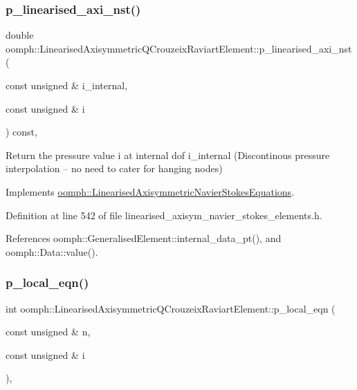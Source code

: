 \subsubsection{\texorpdfstring{p\+\_\+linearised\+\_\+axi\+\_\+nst()}{p\_linearised\_axi\_nst()}}
{\footnotesize\ttfamily double oomph\+::\+Linearised\+Axisymmetric\+Q\+Crouzeix\+Raviart\+Element\+::p\+\_\+linearised\+\_\+axi\+\_\+nst (\begin{DoxyParamCaption}\item[{const unsigned \&}]{i\+\_\+internal,  }\item[{const unsigned \&}]{i }\end{DoxyParamCaption}) const\hspace{0.3cm}{\ttfamily [inline]}, {\ttfamily [virtual]}}



Return the pressure value i at internal dof i\+\_\+internal (Discontinous pressure interpolation -- no need to cater for hanging nodes) 



Implements \hyperlink{classoomph_1_1LinearisedAxisymmetricNavierStokesEquations_aed0485a01052ffe2a5c9f36d6dd07da4}{oomph\+::\+Linearised\+Axisymmetric\+Navier\+Stokes\+Equations}.



Definition at line 542 of file linearised\+\_\+axisym\+\_\+navier\+\_\+stokes\+\_\+elements.\+h.



References oomph\+::\+Generalised\+Element\+::internal\+\_\+data\+\_\+pt(), and oomph\+::\+Data\+::value().

\mbox{\label{classoomph_1_1LinearisedAxisymmetricQCrouzeixRaviartElement_ad3249306342a5b2be80bf0b73c7d2fca}} 
\subsubsection{\texorpdfstring{p\+\_\+local\+\_\+eqn()}{p\_local\_eqn()}}
{\footnotesize\ttfamily int oomph\+::\+Linearised\+Axisymmetric\+Q\+Crouzeix\+Raviart\+Element\+::p\+\_\+local\+\_\+eqn (\begin{DoxyParamCaption}\item[{const unsigned \&}]{n,  }\item[{const unsigned \&}]{i }\end{DoxyParamCaption})\hspace{0.3cm}{\ttfamily [inline]}, {\ttfamily [virtual]}}



